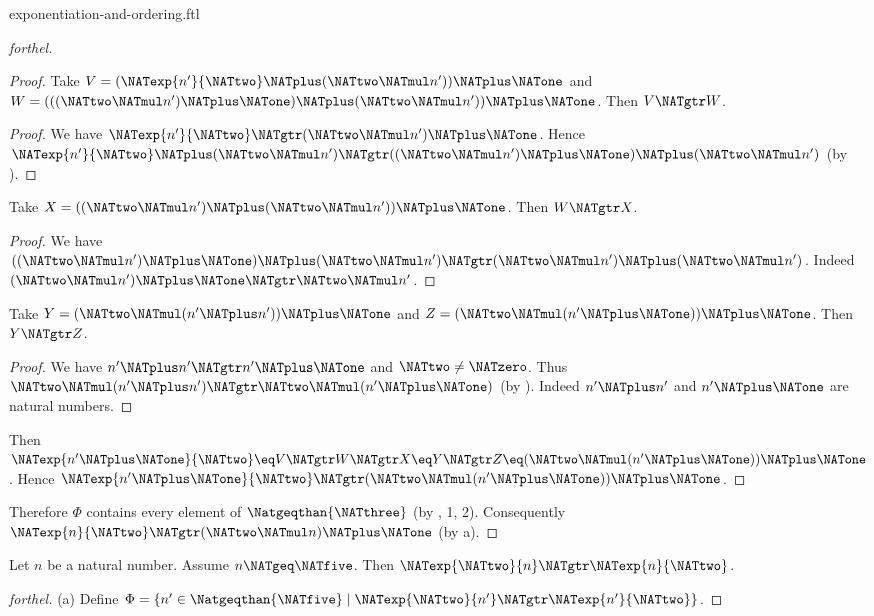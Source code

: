 \documentclass{naproche-library}
\begin{document}
\begin{smodule}[title=Exponentiation and Ordering]{exponentiation-and-ordering.ftl}
\begin{proof}[forthel]
\begin{proof}
    Take $V = (\NATexp{n'}{\NATtwo} \NATplus (\NATtwo \NATmul n')) \NATplus \NATone$ and $W = (((\NATtwo \NATmul n') \NATplus \NATone) \NATplus (\NATtwo \NATmul n')) \NATplus \NATone$.
    Then $V \NATgtr W$.
    \begin{proof}
      We have $\NATexp{n'}{\NATtwo} \NATgtr (\NATtwo \NATmul n') \NATplus \NATone$.
      Hence $\NATexp{n'}{\NATtwo} \NATplus (\NATtwo \NATmul n') \NATgtr ((\NATtwo \NATmul n') \NATplus \NATone) \NATplus (\NATtwo \NATmul n')$ (by ).
    \end{proof}

    Take $X = ((\NATtwo \NATmul n') \NATplus (\NATtwo \NATmul n')) \NATplus \NATone$.
    Then $W \NATgtr X$.
    \begin{proof}
      We have $((\NATtwo \NATmul n') \NATplus \NATone) \NATplus (\NATtwo \NATmul n') \NATgtr (\NATtwo \NATmul n') \NATplus (\NATtwo \NATmul n')$.
      Indeed $(\NATtwo \NATmul n') \NATplus \NATone \NATgtr \NATtwo \NATmul n'$.
    \end{proof}

    Take $Y = (\NATtwo \NATmul (n' \NATplus n')) \NATplus \NATone$ and $Z = (\NATtwo \NATmul (n' \NATplus \NATone)) \NATplus \NATone$.
    Then $Y \NATgtr Z$.
    \begin{proof}
      We have $n' \NATplus n' \NATgtr n' \NATplus \NATone$ and $\NATtwo \neq \NATzero$.
      Thus $\NATtwo \NATmul (n' \NATplus n') \NATgtr \NATtwo \NATmul (n' \NATplus \NATone)$ (by ).
      Indeed $n' \NATplus n'$ and $n' \NATplus \NATone$ are natural numbers.
    \end{proof}

    Then $\NATexp{n' \NATplus \NATone}{\NATtwo} \eq V \NATgtr W \NATgtr X \eq Y \NATgtr Z \eq (\NATtwo \NATmul (n' \NATplus \NATone)) \NATplus \NATone$.
    Hence $\NATexp{n' \NATplus \NATone}{\NATtwo} \NATgtr (\NATtwo \NATmul (n' \NATplus \NATone)) \NATplus \NATone$.
  \end{proof}

  Therefore $\Phi$ contains every element of $\Natgeqthan{\NATthree}$ (by , 1, 2).
  Consequently $\NATexp{n}{\NATtwo} \NATgtr (\NATtwo \NATmul n) \NATplus \NATone$ (by a).
\end{proof}

\begin{proposition}[forthel,id=ARITHMETIC_09_1097950367318016]
  Let $n$ be a natural number.
  Assume $n \NATgeq \NATfive$.
  Then $\NATexp{\NATtwo}{n} \NATgtr \NATexp{n}{\NATtwo}$.
\end{proposition}
\begin{proof}[forthel]
  (a) Define $\Phi = \{ n' \in \Natgeqthan{\NATfive} \mid \NATexp{\NATtwo}{n'} \NATgtr \NATexp{n'}{\NATtwo} \}$.


\end{proof}
\end{smodule}
\end{document}
